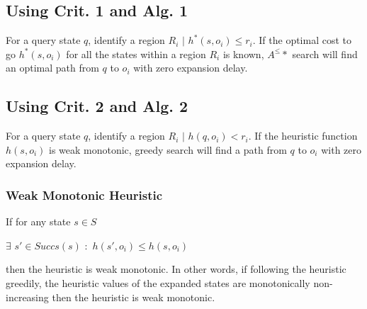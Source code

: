 \documentclass[a4paper]{article}
\begin{document}
\subsection*{Using Crit. 1 and Alg. 1}
For a query state $q$, identify a region $R_i$ $\mid$ $h^*(s, o_i) \leq r_i$.
If the optimal cost to go $h^*(s,o_i)$ for all the states within a region $R_i$ is known, $A^\leq*$ search will find an optimal path from $q$ to $o_i$ with zero expansion delay.

\subsection*{Using Crit. 2 and Alg. 2}
For a query state $q$, identify a region $R_i$ $\mid$ $h(q, o_i) < r_i$.
If the heuristic function $h(s,o_i)$ is weak monotonic, greedy search will find a path from $q$ to $o_i$ with zero expansion delay.\\


\subsubsection*{Weak Monotonic Heuristic}
If for any state $s \in S$
\begin{center}
$\exists$ $s' \in Succs(s)$ $:$ $h(s', o_i) \leq h(s,o_i)$
\end{center}
then the heuristic is weak monotonic. In other words, if following the heuristic greedily, the heuristic values of the expanded states are monotonically non-increasing then the heuristic is weak monotonic.


\end{document}
